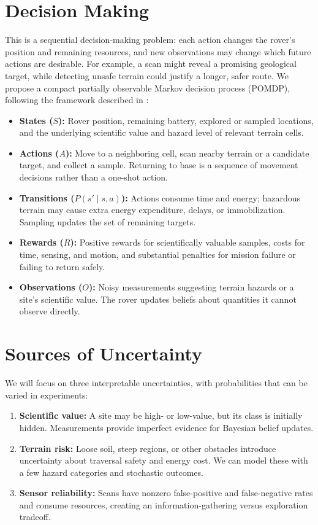 \documentclass[twoside,11pt]{article}
\begin{document}
\section{Decision Making}
This is a sequential decision-making problem: each action changes the rover's position and remaining resources, and new observations may change which future actions are desirable. For example, a scan might reveal a promising geological target, while detecting unsafe terrain could justify a longer, safer route. We propose a compact partially observable Markov decision process (POMDP), following the framework described in \citep{Kochenderfer2022}:
\begin{itemize}
    \item \textbf{States ($S$):} Rover position, remaining battery, explored or sampled locations, and the underlying scientific value and hazard level of relevant terrain cells.
    \item \textbf{Actions ($A$):} Move to a neighboring cell, scan nearby terrain or a candidate target, and collect a sample. Returning to base is a sequence of movement decisions rather than a one-shot action.
    \item \textbf{Transitions ($P(s'\mid s,a)$):} Actions consume time and energy; hazardous terrain may cause extra energy expenditure, delays, or immobilization. Sampling updates the set of remaining targets.
    \item \textbf{Rewards ($R$):} Positive rewards for scientifically valuable samples, costs for time, sensing, and motion, and substantial penalties for mission failure or failing to return safely.
    \item \textbf{Observations ($O$):} Noisy measurements suggesting terrain hazards or a site's scientific value. The rover updates beliefs about quantities it cannot observe directly.
\end{itemize}

\section{Sources of Uncertainty}
We will focus on three interpretable uncertainties, with probabilities that can be varied in experiments:
\begin{enumerate}
    \item \textbf{Scientific value:} A site may be high- or low-value, but its class is initially hidden. Measurements provide imperfect evidence for Bayesian belief updates.
    \item \textbf{Terrain risk:} Loose soil, steep regions, or other obstacles introduce uncertainty about traversal safety and energy cost. We can model these with a few hazard categories and stochastic outcomes.
    \item \textbf{Sensor reliability:} Scans have nonzero false-positive and false-negative rates and consume resources, creating an information-gathering versus exploration tradeoff.
\end{enumerate}
\end{document}

